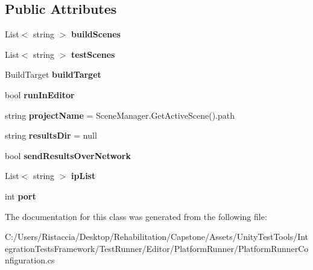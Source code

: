 \subsection*{Public Attributes}
\begin{DoxyCompactItemize}
\item 
\mbox{\label{class_platform_runner_configuration_a8b4c9eb4d808cfd70674f2fb056a717b}} 
List$<$ string $>$ {\bfseries build\+Scenes}
\item 
\mbox{\label{class_platform_runner_configuration_a8f318dd281334987d912a8cdbda3bd3f}} 
List$<$ string $>$ {\bfseries test\+Scenes}
\item 
\mbox{\label{class_platform_runner_configuration_ae179dbea89e687ea16a29352213fdf03}} 
Build\+Target {\bfseries build\+Target}
\item 
\mbox{\label{class_platform_runner_configuration_af3cf0a49236c69e08c75f788e875b5e1}} 
bool {\bfseries run\+In\+Editor}
\item 
\mbox{\label{class_platform_runner_configuration_a4f465e8f2b7de56fba522c6207d0cf05}} 
string {\bfseries project\+Name} = Scene\+Manager.\+Get\+Active\+Scene().path
\item 
\mbox{\label{class_platform_runner_configuration_ad5e3978701ffd6b73594738322ecf723}} 
string {\bfseries results\+Dir} = null
\item 
\mbox{\label{class_platform_runner_configuration_a2064edf05b4fb0404594511a093ea3ca}} 
bool {\bfseries send\+Results\+Over\+Network}
\item 
\mbox{\label{class_platform_runner_configuration_ada3c0e5886556415ec7f42469cf57418}} 
List$<$ string $>$ {\bfseries ip\+List}
\item 
\mbox{\label{class_platform_runner_configuration_a3a6beea86044627f3e66b0dea81ae693}} 
int {\bfseries port}
\end{DoxyCompactItemize}


The documentation for this class was generated from the following file\+:\begin{DoxyCompactItemize}
\item 
C\+:/\+Users/\+Ristaccia/\+Desktop/\+Rehabilitation/\+Capstone/\+Assets/\+Unity\+Test\+Tools/\+Integration\+Tests\+Framework/\+Test\+Runner/\+Editor/\+Platform\+Runner/Platform\+Runner\+Configuration.\+cs\end{DoxyCompactItemize}

